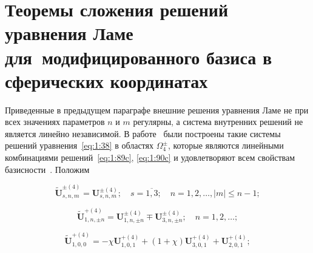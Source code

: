 %
%

\section[Теоремы сложения решений уравнения Ламе для модифицированного базиса в сферических координатах]{Теоремы сложения решений уравнения Ламе для~модифицированного базиса в сферических координатах}

Приведенные в предыдущем параграфе внешние решения уравнения Ламе не при всех значениях параметров $n$ и $m$ регулярны, а система внутренних решений не является линейно независимой. В работе~\cite{Nikolaev1993} были построены такие системы решений уравнения~\eqref{eq:1:38} в областях $\Omega_4^{\pm}$, которые являются линейными комбинациями решений~\eqref{eq:1:89c}, \eqref{eq:1:90c} и удовлетворяют всем свойствам базисности~\cite{Nikolaev1998}. Положим

\begin{equation}\label{eq:1:89b}
\mathbf{\tilde U}_{s,n,m}^{\pm(4)}=\mathbf{U}_{s,n,m}^{\pm(4)};\quad s=\overline{1,3};\quad n=1,2,\dots, |m|\le n-1;
\end{equation}

\begin{equation}\label{eq:1:90b}
\mathbf{\tilde U}_{1,n,\pm n}^{+(4)}=\mathbf{U}_{1,n,\pm n}^{\pm(4)}\mp\mathbf{U}_{3,n,\pm n}^{\pm(4)};\quad n=1,2,\dots;
\end{equation}

\begin{equation}\label{eq:1:91b}
\mathbf{\tilde U}_{1,0,0}^{+(4)}=-\chi\mathbf{U}_{1,0,1}^{+(4)}+(1+\chi)\mathbf{U}_{3,0,1}^{+(4)}+\mathbf{U}_{2,0,1}^{+(4)};
\end{equation}

